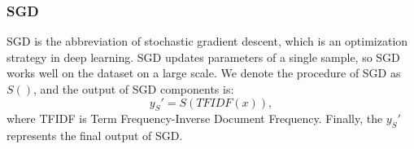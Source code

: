 \subsubsection{SGD}
SGD is the abbreviation of stochastic gradient descent, which is an optimization strategy in deep learning. SGD updates parameters of a single sample, so SGD works well on the dataset on a large scale. We denote the procedure of SGD as $S()$, and the output of SGD components is:
\begin{equation}\label{eq:sgd}
y_S' = S(TFIDF(x)),
\end{equation}
where TFIDF is Term Frequency-Inverse Document Frequency. Finally, the $y_S'$ represents the final output of SGD.